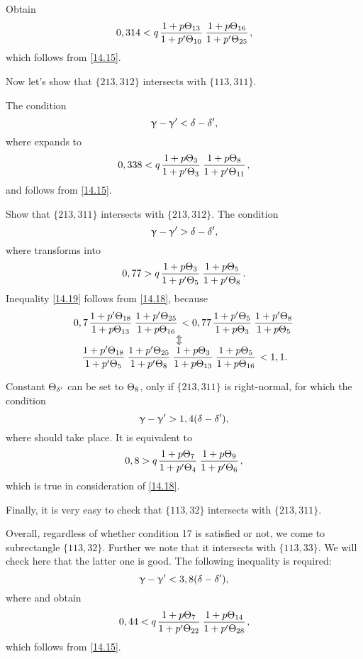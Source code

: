Obtain
\begin{equation*}
	0,314 < q \up{13}{10} \up{16}{25},
\end{equation*}
which follows from \ref{14.15}.

Now let's show that $\{213, 312\}$ intersects with $\{113, 311\}$.

The condition
\begin{equation*}
	\upgamma - \upgamma' < \delta - \delta',
\end{equation*}
where
expands to
\begin{equation*}
	0,338 < q \up{3}{3} \up{8}{11},
\end{equation*}
and follows from \ref{14.15}.

Show that $\{213, 311\}$ intersects with $\{213, 312\}$.
The condition
\begin{equation*}
	\upgamma - \upgamma' > \delta - \delta',
\end{equation*}
where
transforms into
\begin{equation}\label{14.19}
	0,77 > q \up{3}{5} \up{5}{8}.
\end{equation}
Inequality \ref{14.19} follows from \ref{14.18}, because
\begin{gather*}
	0,7 \pu{18}{13} \pu{25}{16} < 0,77 \pu{5}{3} \pu{8}{5}\\
	\ArrowBetweenLines
	\pp{18}{5} \pp{25}{8} \uu{3}{13} \uu{5}{16} < 1,1.
\end{gather*}

Constant $\Theta_{\delta'}$ can be set to $\Theta_{8}$, only if $\{213, 311\}$ is right-normal, for which the condition
\begin{equation*}
	\upgamma - \upgamma' > 1,4 (\delta - \delta'),
\end{equation*}
where
should take place.
It is equivalent to
\begin{equation*}
	0,8 > q \up{7}{4} \up{9}{6},
\end{equation*}
which is true in consideration of \ref{14.18}.

Finally, it is very easy to check that $\{113, 32\}$ intersects with $\{213, 311\}$.

Overall, regardless of whether condition 17 is satisfied or not, we come to subrectangle $\{113, 32\}$.
Further we note that it intersects with $\{113, 33\}$.
We will check here that the latter one is good.
The following inequality is required:
\begin{equation*}
	\upgamma - \upgamma' < 3,8 (\delta - \delta'),
\end{equation*}
where
and obtain
\begin{equation*}
	0,44 < q \up{7}{22} \up{14}{28},
\end{equation*}
which follows from \ref{14.15}.

